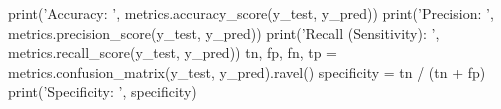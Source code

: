 print('Accuracy: ', metrics.accuracy_score(y_test, y_pred))
print('Precision: ', metrics.precision_score(y_test, y_pred))
print('Recall (Sensitivity): ', metrics.recall_score(y_test, y_pred))
tn, fp, fn, tp = metrics.confusion_matrix(y_test, y_pred).ravel()
specificity = tn / (tn + fp)
print('Specificity: ', specificity)